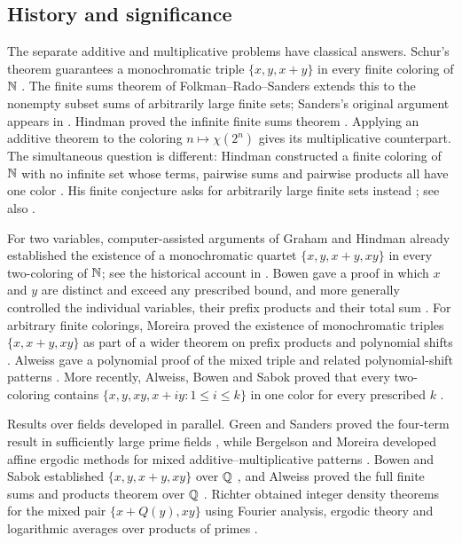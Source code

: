 \subsection{History and significance}

The separate additive and multiplicative problems have classical answers.
Schur's theorem guarantees a monochromatic triple $\{x,y,x+y\}$ in every
finite coloring of $\mathbb N$ \cite{Schur}.
The finite sums theorem of Folkman--Rado--Sanders extends this to the
nonempty subset sums of arbitrarily large finite sets; Sanders's original
argument appears in \cite[Theorem~2 and Corollary~1.1]{Sanders}.
Hindman proved the infinite finite sums theorem \cite{Hindman}.
Applying an additive theorem to the coloring $n\mapsto\chi(2^n)$ gives
its multiplicative counterpart. The simultaneous question is different:
Hindman constructed a finite coloring of $\mathbb N$ with no infinite set whose terms,
pairwise sums and pairwise products all have one color
\cite{Hindman1980}.
His finite conjecture asks for arbitrarily large finite sets instead
\cite{Hindman1979}; see also
\cite[Question~17.18]{HindmanStrauss}.

For two variables, computer-assisted arguments of Graham and Hindman
already established the existence of a monochromatic quartet
$\{x,y,x+y,xy\}$ in every two-coloring of $\mathbb N$; see the historical
account in \cite[p.~82]{HindmanPhulara}.
Bowen gave a proof in which $x$ and $y$ are distinct and exceed any
prescribed bound, and more generally controlled the individual variables, their prefix
products and their total sum \cite[Theorem~1.1]{BowenTwoColors}.
For arbitrary finite colorings, Moreira proved the existence of
monochromatic triples $\{x,x+y,xy\}$ as part of a wider theorem on
prefix products and polynomial shifts \cite[Theorem~1.4 and
Corollary~1.5]{Moreira}.
Alweiss gave a polynomial proof of the mixed triple and related
polynomial-shift patterns \cite[Theorem~1.2]{AlweissPolynomials}.
More recently, Alweiss, Bowen and Sabok proved that every two-coloring
contains $\{x,y,xy,x+iy:1\le i\le k\}$ in one color for every prescribed
$k$ \cite[Theorem~1.2]{AlweissBowenSabok}.

Results over fields developed in parallel. Green and Sanders proved
the four-term result in sufficiently large prime fields
\cite[Theorem~1.2]{GreenSanders}, while Bergelson and Moreira developed
affine ergodic methods for mixed additive--multiplicative patterns
\cite{BergelsonMoreiraField,BergelsonMoreiraAffine}.
Bowen and Sabok established $\{x,y,x+y,xy\}$ over $\mathbb Q$
\cite[Theorem~1.1]{BowenSabok}, and Alweiss proved the full finite sums
and products theorem over $\mathbb Q$ \cite[Theorem~1.3]{Alweiss}.
Richter obtained integer density theorems for the mixed
pair $\{x+Q(y),xy\}$ using Fourier analysis, ergodic theory and
logarithmic averages over products of primes \cite[Theorems~1.5 and
1.7]{Richter}.

